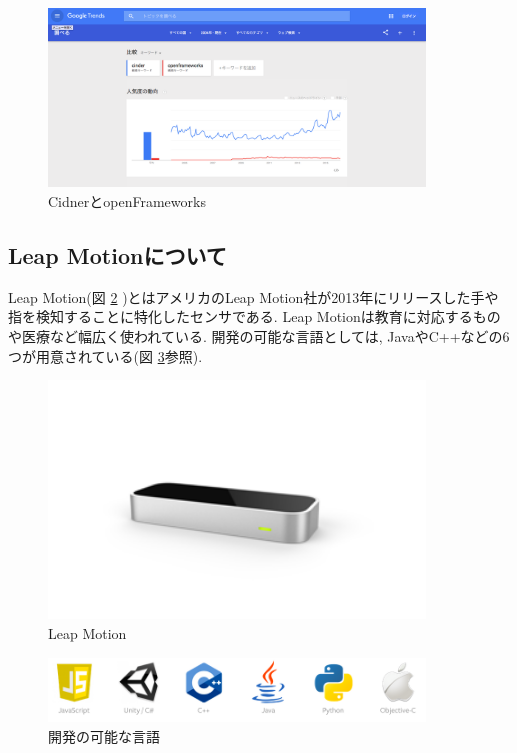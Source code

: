 \documentclass{funthesis}
\begin{document}
\begin{figure}[H]
 \begin{center}
  \includegraphics[width=100mm]{./img/api.png}
 \end{center}
 \caption{CidnerとopenFrameworks}
 \label{API}
\end{figure}


\subsection{Leap Motionについて}
Leap Motion(図 \ref{LeapMotion} )とはアメリカのLeap Motion社が2013年にリリースした手や指を検知することに特化したセンサである. Leap Motionは教育に対応するものや医療など幅広く使われている. 開発の可能な言語としては, JavaやC++などの6つが用意されている(図 \ref{Leapdoc}参照).



\begin{figure}[H]
 \begin{center}
  \includegraphics[width=100mm]{./img/LeapMotion.png}
 \end{center}
 \caption{Leap Motion}
 \label{LeapMotion}
\end{figure}

\begin{figure}[H]
 \begin{center}
  \includegraphics[width=100mm]{./img/Leapdoc.png}
 \end{center}
 \caption{開発の可能な言語}
 \label{Leapdoc}
\end{figure}
\end{document}
